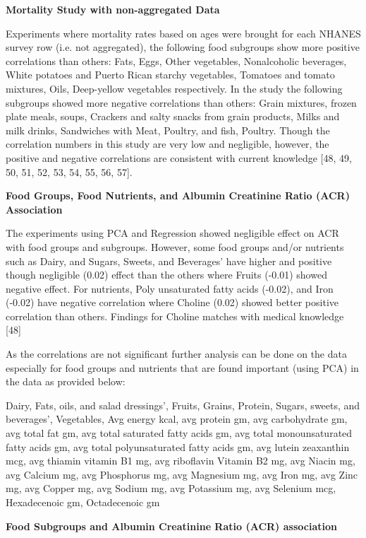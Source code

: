 \noindent \textbf{Mortality Study with non-aggregated Data}

\noindent Experiments where mortality rates based on ages were brought for each NHANES survey row (i.e. not aggregated), the following food subgroups show more positive correlations than others: Fats, Eggs, Other vegetables, Nonalcoholic beverages, White potatoes and Puerto Rican starchy vegetables, Tomatoes and tomato mixtures, Oils, Deep-yellow vegetables respectively. In the study the following subgroups showed more negative correlations than others: Grain mixtures, frozen plate meals, soups, Crackers and salty snacks from grain products, Milks and milk drinks, Sandwiches with Meat, Poultry, and fish, Poultry. Though the correlation numbers in this study are very low and negligible, however, the positive and negative correlations are consistent with current knowledge [48, 49, 50, 51, 52, 53, 54, 55, 56, 57].

\noindent \textbf{Food Groups, Food Nutrients, and Albumin Creatinine Ratio (ACR) Association}

\noindent The experiments using PCA and Regression showed negligible effect on ACR with food groups and subgroups. However, some food groups and/or nutrients such as Dairy, and  Sugars, Sweets, and Beverages’  have higher and positive though negligible (0.02) effect than the others where Fruits (-0.01) showed negative effect.  For nutrients, Poly unsaturated fatty acids (-0.02), and Iron (-0.02) have negative correlation where Choline (0.02) showed better positive correlation than others. Findings for Choline matches with medical knowledge [48]

 \noindent As the correlations are not significant further analysis can be done on the data especially for food groups and nutrients that are found important (using PCA) in the data as provided below:

\noindent Dairy,  Fats, oils, and salad dressings’,  Fruits,  Grains,  Protein,   Sugars, sweets, and beverages’, Vegetables, Avg energy kcal,  avg protein gm,  avg carbohydrate gm,  avg total fat gm,  avg total saturated fatty acids gm, avg total monounsaturated fatty acids gm,  avg total polyunsaturated fatty acids gm, avg lutein zeaxanthin mcg,  avg thiamin vitamin B1 mg,  avg riboflavin Vitamin B2 mg,  avg Niacin mg, avg Calcium mg,  avg Phosphorus mg,  avg Magnesium mg,  avg Iron mg, avg Zinc mg,  avg Copper mg,  avg Sodium mg,  avg Potassium mg,  avg Selenium mcg,  Hexadecenoic gm,  Octadecenoic gm

\noindent \textbf{Food Subgroups and Albumin Creatinine Ratio (ACR) association}

